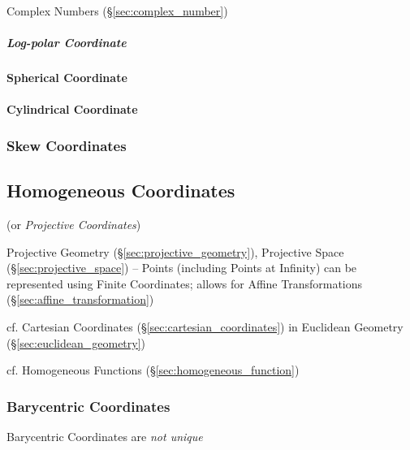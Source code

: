 \fist Complex Numbers (\S\ref{sec:complex_number})



\subparagraph{Log-polar Coordinate}\label{sec:logpolar_coordinates}\hfill



\paragraph{Spherical Coordinate}\label{sec:spherical_coordinates}\hfill

\paragraph{Cylindrical Coordinate}\label{sec:cylindrical_coordinates}\hfill



\subsubsection{Skew Coordinates}\label{sec:skew_coordinates}



\subsection{Homogeneous Coordinates}\label{sec:homogeneous_coordinates}

(or \emph{Projective Coordinates})

Projective Geometry (\S\ref{sec:projective_geometry}), Projective
Space (\S\ref{sec:projective_space}) -- Points (including Points at
Infinity) can be represented using Finite Coordinates; allows for
Affine Transformations (\S\ref{sec:affine_transformation})

\fist cf. Cartesian Coordinates (\S\ref{sec:cartesian_coordinates}) in
Euclidean Geometry (\S\ref{sec:euclidean_geometry})

\fist cf. Homogeneous Functions (\S\ref{sec:homogeneous_function})



\subsubsection{Barycentric Coordinates}\label{sec:barycentric_coordinates}

Barycentric Coordinates are \emph{not unique}

